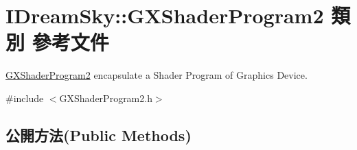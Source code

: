 \hypertarget{class_i_dream_sky_1_1_g_x_shader_program2}{}\section{I\+Dream\+Sky\+:\+:G\+X\+Shader\+Program2 類別 參考文件}
\label{class_i_dream_sky_1_1_g_x_shader_program2}


\hyperlink{class_i_dream_sky_1_1_g_x_shader_program2}{G\+X\+Shader\+Program2} encapsulate a Shader Program of Graphics Device.  




{\ttfamily \#include $<$G\+X\+Shader\+Program2.\+h$>$}

\subsection*{公開方法(Public Methods)}
